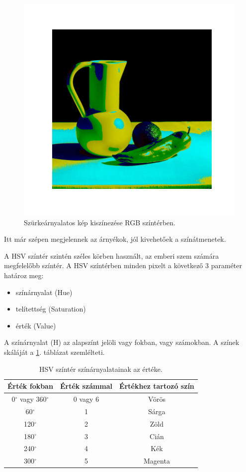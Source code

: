 \begin{figure}[h]
\centering
\includegraphics[scale=0.7]{images/colorized_rgb.png}
\caption{Szürkeárnyalatos kép kiszínezése RGB színtérben.}
\label{fig:colorized_rgb}
\end{figure}

Itt már szépen megjelennek az árnyékok, jól kivehetőek a színátmenetek.


A HSV színtér szintén széles körben használt, az emberi szem számára megfelelőbb színtér. A HSV színtérben minden pixelt a következő 3 paraméter határoz meg:
\begin{itemize}
\item színárnyalat (Hue)
\item telítettség (Saturation)
\item érték (Value)
\end{itemize}

A színárnyalat (H) az alapszínt jelöli vagy fokban, vagy számokban. A színek skáláját a \ref{tab:hsv_colors}. táblázat szemlélteti.

\begin{table}[h]
\centering
\caption{HSV színtér színárnyalatainak az értéke.}
\label{tab:hsv_colors}
\medskip
\begin{tabular}{|c|c|c|}
\hline
Érték fokban & Érték számmal & Értékhez tartozó szín \\
\hline
0$^{\circ}$ vagy 360$^{\circ}$ & 0 vagy 6 & Vörös \\
\hline
60$^{\circ}$ & 1 & Sárga \\
\hline
120$^{\circ}$ & 2 & Zöld \\
\hline
180$^{\circ}$ & 3 & Cián \\
\hline
240$^{\circ}$ & 4 & Kék \\
\hline
300$^{\circ}$ & 5 & Magenta \\
\hline
\end{tabular}
\end{table}

